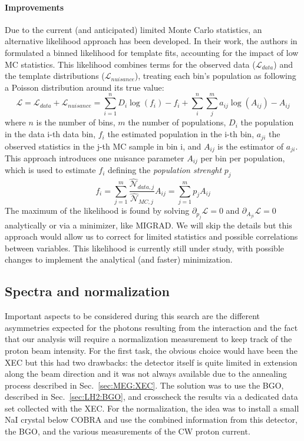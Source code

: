 \begin{refsection}
\paragraph{Improvements}
Due to the current (and anticipated) limited Monte Carlo statistics, an alternative likelihood approach has been developed. 
In their work, the authors in \cite{X17:likelihood:BB} formulated a binned likelihood for template fits, accounting for the impact of low MC statistics. 
This likelihood combines terms for the observed data ($\mathcal{L}_{data}$) and the template distributions ($\mathcal{L}_{nuisance}$), treating each bin's population as following a Poisson distribution around its true value:
\begin{equation}
    \mathcal{L} = \mathcal{L}_{data} + \mathcal{L}_{nuisance} =
    \sum_{i=1}^n D_i \log (f_i) - f_i + \sum_{i}^{n}\sum_{j}^{m}a_{ij}\log (A_{ij})-A_{ij}
\end{equation}
where $n$ is the number of bins, $m$ the number of populations, $D_i$ the population in the data i-th data bin, $f_i$ the estimated population in the i-th bin, $a_{ji}$ the observed statistics in the j-th MC sample in bin i, and $A_{ij}$ is the estimator of $a_{ji}$.
This approach introduces one nuisance parameter $A_{ij}$ per bin per population, which is used to estimate $f_i$ defining the \textit{population strenght} $p_j$
\begin{equation}
    f_i=\sum_{j=1}^m \frac{\hat{\mathcal{N}}_{data,j}}{\hat{\mathcal{N}}_{MC,j}} A_{ij}= \sum_{j=1}^m p_j A_{ij}
\end{equation}
The maximum of the likelihood is found by solving $\partial_{p_j}\mathcal{L}=0$ and  $\partial_{A_{ji}}\mathcal{L}=0$ analytically or via a minimizer, like MIGRAD.
We will skip the details but this approach would allow us to correct for limited statistics and possible correlations between variables.
This likelihood is currently still under study, with possible changes to implement the analytical (and faster) minimization.

    \subsection{Spectra and normalization}
        Important aspects to be considered during this search are the different asymmetries expected for the photons resulting from the interaction and the fact that our analysis will require a normalization measurement to keep track of the proton beam intensity.
        For the first task, the obvious choice would have been the XEC but this had two drawbacks: the detector itself is quite limited in extension along the beam direction and it was not always available due to the annealing process described in Sec.~\ref{sec:MEG:XEC}.
        The solution was to use the BGO, described in Sec.~\ref{sec:LH2:BGO}, and crosscheck the results via a dedicated data set collected with the XEC.
        For the normalization, the idea was to install a small NaI crystal below COBRA and use the combined information from this detector, the BGO, and the various measurements of the CW proton current.



\end{refsection}
